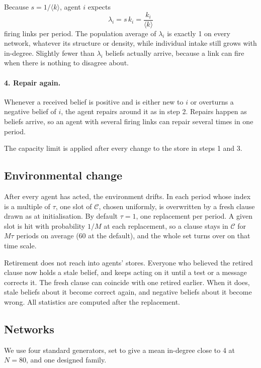 \documentclass[11pt]{article}
\begin{document}
Because $s = 1/\langle k\rangle$, agent $i$ expects
\begin{equation}\label{eq:intake}
\lambda_i = s\,k_i = \frac{k_i}{\langle k\rangle}
\end{equation}
firing links per period. The population average of $\lambda_i$ is exactly 1 on every network, whatever its structure or density, while individual intake still grows with in-degree. Slightly fewer than $\lambda_i$ beliefs actually arrive, because a link can fire when there is nothing to disagree about.

\paragraph{4. Repair again.} Whenever a received belief is positive and is either new to $i$ or overturns a negative belief of $i$, the agent repairs around it as in step 2. Repairs happen as beliefs arrive, so an agent with several firing links can repair several times in one period.

The capacity limit is applied after every change to the store in steps 1 and 3.

\subsection{Environmental change}

After every agent has acted, the environment drifts. In each period whose index is a multiple of $\tau$, one slot of $\mathcal{C}$, chosen uniformly, is overwritten by a fresh clause drawn as at initialisation. By default $\tau = 1$, one replacement per period. A given slot is hit with probability $1/M$ at each replacement, so a clause stays in $\mathcal{C}$ for $M\tau$ periods on average (60 at the default), and the whole set turns over on that time scale.

Retirement does not reach into agents' stores. Everyone who believed the retired clause now holds a stale belief, and keeps acting on it until a test or a message corrects it. The fresh clause can coincide with one retired earlier. When it does, stale beliefs about it become correct again, and negative beliefs about it become wrong. All statistics are computed after the replacement.

\subsection{Networks}

We use four standard generators, set to give a mean in-degree close to 4 at $N = 80$, and one designed family.
\end{document}
